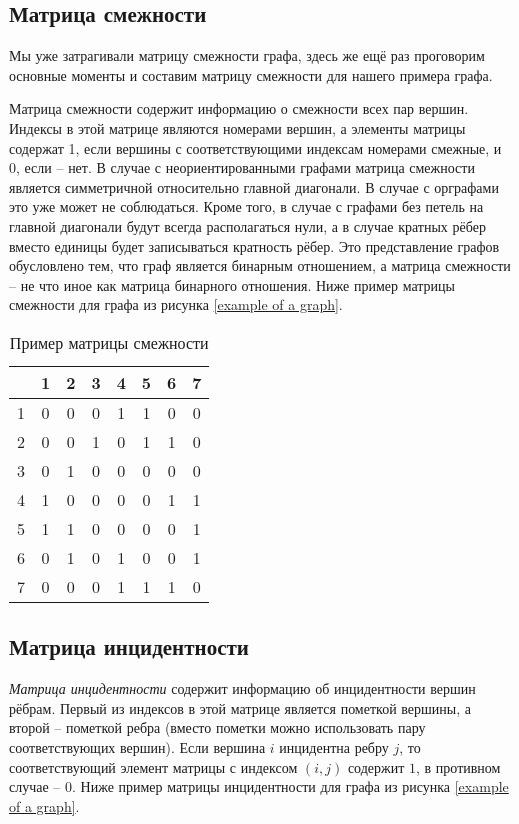 \subsection{Матрица смежности}

Мы уже затрагивали матрицу смежности графа, здесь же ещё раз проговорим основные
моменты и составим матрицу смежности для нашего примера графа.

Матрица смежности содержит информацию о смежности всех пар вершин. Индексы в 
этой матрице являются номерами вершин, а элементы матрицы содержат 1, если 
вершины с соответствующими индексам номерами смежные, и 0, если – нет. В случае 
с неориентированными графами матрица смежности является симметричной 
относительно главной диагонали. В случае с орграфами это уже может не 
соблюдаться. Кроме того, в случае с графами без петель на главной диагонали 
будут всегда располагаться нули, а в случае кратных рёбер вместо единицы будет 
записываться кратность рёбер. Это представление графов обусловлено тем, что 
граф является бинарным отношением, а матрица смежности – не что иное как 
матрица бинарного отношения. Ниже пример матрицы смежности для графа из рисунка 
\ref{example of a graph}.

\begin{table}[h]
	\center
	\begin{tabular}{|c|ccccccc|}
		\hline
		\space & 1 & 2 & 3 & 4 & 5 & 6 & 7\\
		\hline
		1 & 0 & 0 & 0 & 1 & 1 & 0 & 0\\
		2 & 0 & 0 & 1 & 0 & 1 & 1 & 0\\
		3 & 0 & 1 & 0 & 0 & 0 & 0 & 0\\
		4 & 1 & 0 & 0 & 0 & 0 & 1 & 1\\
		5 & 1 & 1 & 0 & 0 & 0 & 0 & 1\\
		6 & 0 & 1 & 0 & 1 & 0 & 0 & 1\\
		7 & 0 & 0 & 0 & 1 & 1 & 1 & 0\\
		\hline
	\end{tabular}
	\caption{Пример матрицы смежности}
\end{table}

\subsection{Матрица инцидентности}

\emph{Матрица инцидентности} содержит информацию об инцидентности вершин 
рёбрам. Первый из индексов в этой матрице является пометкой вершины, а второй -- пометкой ребра (вместо пометки можно использовать пару соответствующих вершин). Если вершина $i$ инцидентна ребру $j$, то соответствующий элемент матрицы с индексом $(i,j)$ содержит $1$, в противном случае – $0$. Ниже пример матрицы инцидентности для графа из рисунка \ref{example of a graph}.

